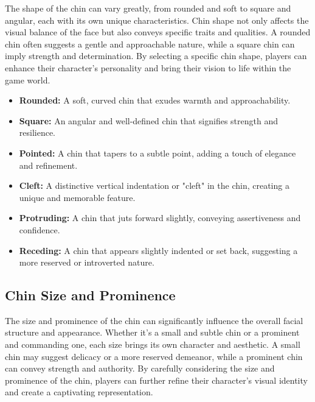 The shape of the chin can vary greatly, from rounded and soft to square and angular, each with its own unique characteristics. Chin shape not only affects the visual balance of the face but also conveys specific traits and qualities. A rounded chin often suggests a gentle and approachable nature, while a square chin can imply strength and determination. By selecting a specific chin shape, players can enhance their character's personality and bring their vision to life within the game world.

\begin{itemize}
    \item \textbf{Rounded:} A soft, curved chin that exudes warmth and approachability.
    \item \textbf{Square:} An angular and well-defined chin that signifies strength and resilience.
    \item \textbf{Pointed:} A chin that tapers to a subtle point, adding a touch of elegance and refinement.
    \item \textbf{Cleft:} A distinctive vertical indentation or "cleft" in the chin, creating a unique and memorable feature.
    \item \textbf{Protruding:} A chin that juts forward slightly, conveying assertiveness and confidence.
    \item \textbf{Receding:} A chin that appears slightly indented or set back, suggesting a more reserved or introverted nature.
\end{itemize}

\subsection{\textbf{Chin Size and Prominence}}

The size and prominence of the chin can significantly influence the overall facial structure and appearance. Whether it's a small and subtle chin or a prominent and commanding one, each size brings its own character and aesthetic. A small chin may suggest delicacy or a more reserved demeanor, while a prominent chin can convey strength and authority. By carefully considering the size and prominence of the chin, players can further refine their character's visual identity and create a captivating representation.

